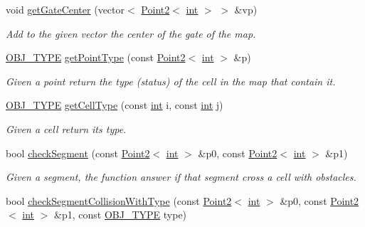 \begin{DoxyCompactItemize}
void \mbox{\hyperlink{class_mapp_a7b17d1a5e8567021465397088e1dea8d}{get\+Gate\+Center}} (vector$<$ \mbox{\hyperlink{class_point2}{Point2}}$<$ \mbox{\hyperlink{draw_8hh_aa620a13339ac3a1177c86edc549fda9b}{int}} $>$ $>$ \&vp)
\begin{DoxyCompactList}\small\item\em Add to the given vector the center of the gate of the map. \end{DoxyCompactList}\item 
\mbox{\hyperlink{map_8hh_a714b9c2c276fbae637fee36453d9121e}{O\+B\+J\+\_\+\+T\+Y\+PE}} \mbox{\hyperlink{class_mapp_ac6341641bd67502eef7c025cb4cd1c71}{get\+Point\+Type}} (const \mbox{\hyperlink{class_point2}{Point2}}$<$ \mbox{\hyperlink{draw_8hh_aa620a13339ac3a1177c86edc549fda9b}{int}} $>$ \&p)
\begin{DoxyCompactList}\small\item\em Given a point return the type (status) of the cell in the map that contain it. \end{DoxyCompactList}\item 
\mbox{\hyperlink{map_8hh_a714b9c2c276fbae637fee36453d9121e}{O\+B\+J\+\_\+\+T\+Y\+PE}} \mbox{\hyperlink{class_mapp_aba5cd0247782b0d06bc2bb7ff8ff93af}{get\+Cell\+Type}} (const \mbox{\hyperlink{draw_8hh_aa620a13339ac3a1177c86edc549fda9b}{int}} i, const \mbox{\hyperlink{draw_8hh_aa620a13339ac3a1177c86edc549fda9b}{int}} j)
\begin{DoxyCompactList}\small\item\em Given a cell return its type. \end{DoxyCompactList}\item 
bool \mbox{\hyperlink{class_mapp_ade6135be96d93778352a7a313793adf3}{check\+Segment}} (const \mbox{\hyperlink{class_point2}{Point2}}$<$ \mbox{\hyperlink{draw_8hh_aa620a13339ac3a1177c86edc549fda9b}{int}} $>$ \&p0, const \mbox{\hyperlink{class_point2}{Point2}}$<$ \mbox{\hyperlink{draw_8hh_aa620a13339ac3a1177c86edc549fda9b}{int}} $>$ \&p1)
\begin{DoxyCompactList}\small\item\em Given a segment, the function answer if that segment cross a cell with obstacles. \end{DoxyCompactList}\item 
bool \mbox{\hyperlink{class_mapp_a8c48e05ec516f82efa0b1b7febe41292}{check\+Segment\+Collision\+With\+Type}} (const \mbox{\hyperlink{class_point2}{Point2}}$<$ \mbox{\hyperlink{draw_8hh_aa620a13339ac3a1177c86edc549fda9b}{int}} $>$ \&p0, const \mbox{\hyperlink{class_point2}{Point2}}$<$ \mbox{\hyperlink{draw_8hh_aa620a13339ac3a1177c86edc549fda9b}{int}} $>$ \&p1, const \mbox{\hyperlink{map_8hh_a714b9c2c276fbae637fee36453d9121e}{O\+B\+J\+\_\+\+T\+Y\+PE}} type)

\end{DoxyCompactItemize}
